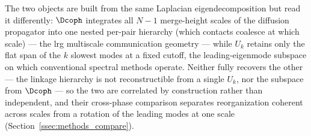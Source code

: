 %
%
The two objects are built from the same Laplacian eigendecomposition but read it differently: \(\Dcoph\) integrates all \(N-1\) merge-height scales of the diffusion propagator into one nested per-pair hierarchy (which contacts coalesce at which scale) --- the \gls{lrg} multiscale communication geometry --- while \(U_{k}\) retains only the flat span of the \(k\) slowest modes at a fixed cutoff, the leading-eigenmode subspace on which conventional spectral methods operate. Neither fully recovers the other --- the linkage hierarchy is not reconstructible from a single \(U_{k}\), nor the subspace from \(\Dcoph\) --- so the two are correlated by construction rather than independent, and their cross-phase comparison separates reorganization coherent across scales from a rotation of the leading modes at one scale (Section~\ref{ssec:methods_compare}).

